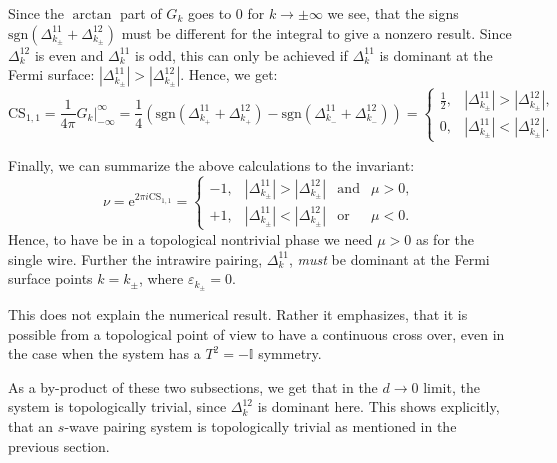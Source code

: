 Since the $\arctan$ part of $G_k$ goes to $0$ for $k\to \pm \infty$ we see, that the signs $\text{sgn}(\Delta^{11}_{k_\pm} + \Delta^{12}_{k_\pm})$ must be different for the integral to give a nonzero result. Since $\Delta^{12}_{k}$ is even and $\Delta^{11}_{k}$ is odd, this can only be achieved if $\Delta^{11}_{k}$ is dominant at the Fermi surface: $|\Delta^{11}_{k_\pm}| > |\Delta^{12}_{k_\pm}|$. Hence, we get:
\begin{equation}
\text{CS}_{1,1} = \frac{1}{4\pi} \left. G_k \right|^\infty_{-\infty} = \frac{1}{4}(\text{sgn}(\Delta^{11}_{k_+} + \Delta^{12}_{k_+}) - \text{sgn}(\Delta^{11}_{k_-} + \Delta^{12}_{k_-})) = \left\{ \begin{matrix} 
\frac{1}{2}, & |\Delta^{11}_{k_\pm}| > |\Delta^{12}_{k_\pm}|, \\
0, & |\Delta^{11}_{k_\pm}| < |\Delta^{12}_{k_\pm}|.
  \end{matrix} \right. \nonumber 
\end{equation}

Finally, we can summarize the above calculations to the invariant:
\begin{equation}
\nu = \text{e}^{2\pi i \text{CS}_{1,1}} = \left\{ \begin{matrix} 
-1, & |\Delta^{11}_{k_\pm}| > |\Delta^{12}_{k_\pm}| & \text{and} & \mu > 0, \\
+1, & |\Delta^{11}_{k_\pm}| < |\Delta^{12}_{k_\pm}| & \text{or} & \mu < 0.
  \end{matrix} \right.
\label{eq.CS11T2eqminus1}
\end{equation}
Hence, to have be in a topological nontrivial phase we need $\mu > 0$ as for the single wire. Further the intrawire pairing, $\Delta^{11}_k$, \textit{must} be dominant at the Fermi surface points $k = k_\pm$, where $\varepsilon_{k_\pm} = 0$. 

This does not explain the numerical result. Rather it emphasizes, that it is possible from a topological point of view to have a continuous cross over, even in the case when the system has a $T^2 = -\mathbb{I}$ symmetry. 

As a by-product of these two subsections, we get that in the $d \to 0$ limit, the system is topologically trivial, since $\Delta^{12}_k$ is dominant here. This shows explicitly, that an $s$-wave pairing system is topologically trivial as mentioned in the previous section. 



